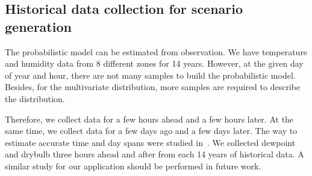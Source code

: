 \documentclass[journal]{IEEEtran} %
\begin{document}
  
  
  


%
%
%












\subsection{Historical data collection for scenario generation}
The probabilistic model can be estimated from observation. We have temperature and humidity data from 8 different zones for 14 years. However, at the given day of year and hour, there are not many samples to build the probabilistic model. Besides, for the multivariate distribution, more samples are required to describe the distribution. 

Therefore, we collect data for a few hours ahead and a few hours later. At the same time, we collect data for a few days ago and a few days later. The way to estimate accurate time and day spans were studied in~\cite{xie2016temperature}. We collected dewpoint and drybulb three hours ahead and after from each 14 years of historical data. A similar study for our application should be performed in future work.
\end{document}
